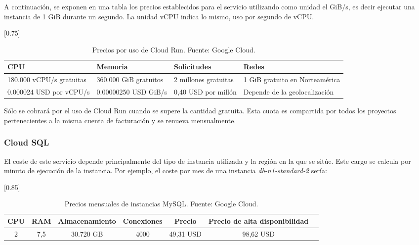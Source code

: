 A continuación, se exponen en una tabla los precios establecidos para el servicio utilizando como unidad el GiB/s, es decir ejecutar una instancia de 1 GiB durante un segundo. La unidad vCPU indica lo mismo, uso por segundo de vCPU.

\begin{table} [htbp]
	\centering
	 \scalebox{0.75}[0.75] {
	\begin{tabular}{l l l l}
		\textbf{CPU} & \textbf{Memoria} & \textbf{Solicitudes} & \textbf{Redes} \\ 
		\hline
		180.000 vCPU/s gratuitas &
		360.000 GiB gratuitos &
		2 millones gratuitas &
		1 GiB gratuito en Norteamérica \\
		
		0.000024 USD por vCPU/s &
		0.00000250 USD GiB/s &
		0,40 USD por millón &
		Depende de la geolocalización \\

	\end{tabular}}
	\centering
	\caption{\label{tab:costeCloudRun}Precios por uso de Cloud Run. Fuente: Google Cloud.}
\end{table}

Sólo se cobrará por el uso de Cloud Run cuando se supere la cantidad gratuita. Esta cuota es compartida por todos los proyectos pertenecientes a la misma cuenta de facturación y se renueva mensualmente.

\subsubsection{Cloud SQL}

El coste de este servicio depende principalmente del tipo de instancia utilizada y la región en la que se sitúe. Este cargo se calcula por minuto de ejecución de la instancia. Por ejemplo, el coste por mes de una instancia \textit{db-n1-standard-2} sería:

\begin{table} [htbp]
	\centering
	\scalebox{0.85}[0.85] {
	\begin{tabular}{c c c c c c c}
		\textbf{CPU} & \textbf{RAM} & \textbf{Almacenamiento} & \textbf{Conexiones} & 
		\textbf{Precio} & \textbf{Precio de alta disponibilidad}	\\ 
		\hline
         2 & 7,5 & 30.720 GB & 4000 & 49,31 USD & 98,62 USD\\
	\end{tabular}}
	\centering
	\caption{\label{tab:costeMySQL}Precios mensuales de instancias MySQL. Fuente: Google Cloud.}
\end{table}

